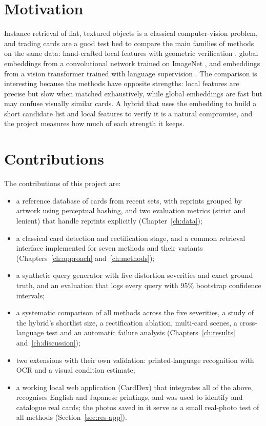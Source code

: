 \section{Motivation}

Instance retrieval of flat, textured objects is a classical computer-vision problem, and trading cards are a good test bed to compare the main families of methods on the same data: hand-crafted local features with geometric verification \citep{lowe2004sift, rublee2011orb, fischler1981ransac}, global embeddings from a convolutional network trained on ImageNet \citep{he2016resnet}, and embeddings from a vision transformer trained with language supervision \citep{dosovitskiy2021vit, radford2021clip}. The comparison is interesting because the methods have opposite strengths: local features are precise but slow when matched exhaustively, while global embeddings are fast but may confuse visually similar cards. A hybrid that uses the embedding to build a short candidate list and local features to verify it is a natural compromise, and the project measures how much of each strength it keeps.

\section{Contributions}

The contributions of this project are:
\begin{itemize}
  \item a reference database of  cards from  recent sets, with reprints grouped by artwork using perceptual hashing, and two evaluation metrics (strict and lenient) that handle reprints explicitly (Chapter~\ref{ch:data});
  \item a classical card detection and rectification stage, and a common retrieval interface implemented for seven methods and their variants (Chapters~\ref{ch:approach} and~\ref{ch:methods});
  \item a synthetic query generator with five distortion severities and exact ground truth, and an evaluation that logs every query with 95\% bootstrap confidence intervals;
  \item a systematic comparison of all methods across the five severities, a study of the hybrid's shortlist size, a rectification ablation, multi-card scenes, a cross-language test and an automatic failure analysis (Chapters~\ref{ch:results} and~\ref{ch:discussion});
  \item two extensions with their own validation: printed-language recognition with OCR and a visual condition estimate;
  \item a working local web application (CardDex) that integrates all of the above, recognises English and Japanese printings, and was used to identify and catalogue real cards; the photos saved in it serve as a small real-photo test of all methods (Section~\ref{sec:res-app}).
\end{itemize}
